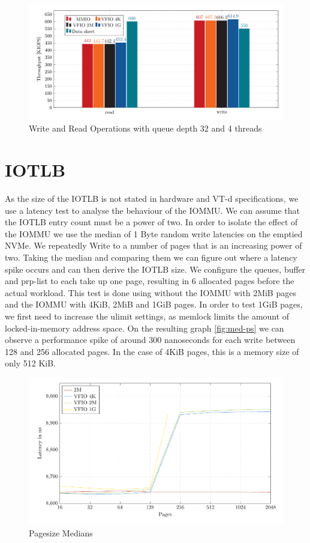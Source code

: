 \begin{figure}
    \centering
    \includegraphics[width=\textwidth]{figures/throughputqd32t1singlepage}
    \caption{Write and Read Operations with queue depth 32 and 4 threads}
    \label{fig:iopsq32t1sp}
\end{figure}

\section{IOTLB}
As the size of the IOTLB is not stated in hardware and VT-d specifications, we use a latency test to analyse the behaviour of the IOMMU. We can assume that the IOTLB entry count must be a power of two. In order to isolate the effect of the IOMMU we use the median of 1 Byte random write latencies on the emptied NVMe. We repeatedly Write to a number of pages that is an increasing power of two. Taking the median and comparing them we can figure out where a latency spike occurs and can then derive the IOTLB size. We configure the queues, buffer and prp-list to each take up one page, resulting in 6 allocated pages before the actual workload. This test is done using without the IOMMU with 2MiB pages and the IOMMU with 4KiB, 2MiB and 1GiB pages.
In order to test 1GiB pages, we first need to increase the ulimit settings, as memlock limits the amount of locked-in-memory address space.
On the resulting graph \autoref{fig:med-ps} we can observe a performance spike of around 300 nanoseconds for each write between 128 and 256 allocated pages. In the case of 4KiB pages, this is a memory size of only 512 KiB.

\begin{figure}
    \centering
    \includegraphics[width=\textwidth]{figures/pagesizemedians}
    \caption{Pagesize Medians}
    \label{fig:med-ps}
\end{figure}

